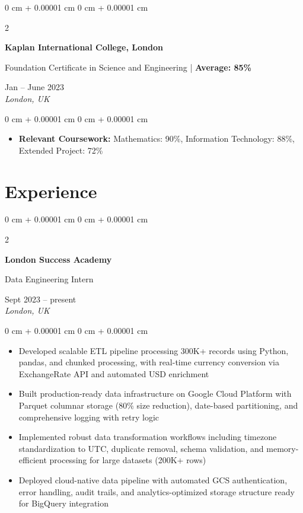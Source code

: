 \documentclass[10pt, a4paper]{article}
\newenvironment{highlights}{
    \begin{itemize}[
        topsep=0.10 cm,
        parsep=0.10 cm,
        partopsep=0pt,
        itemsep=0pt,
        leftmargin=20pt
    ]
}{
    \end{itemize}
} %
\newenvironment{onecolentry}{
    \begin{adjustwidth}{
        0 cm + 0.00001 cm
    }{
        0 cm + 0.00001 cm
    }
}{
    \end{adjustwidth}
} %
\newenvironment{twocolentry}[2][]{
    \onecolentry
    \def\secondColumn{#2}
    \setcolumnwidth{\fill, 4.5 cm}
    \begin{paracol}{2}
}{
    \switchcolumn \raggedleft \secondColumn
    \end{paracol}
    \endonecolentry
} %
\begin{document}
    \begin{twocolentry}{
        Jan -- June 2023 \\
        \textit{London, UK}
    }
        \textbf{Kaplan International College, London}

        Foundation Certificate in Science and Engineering | \textbf{Average: 85\%}
    \end{twocolentry}

    \vspace{0.10 cm}
    \begin{onecolentry}
        \begin{highlights}
            \item \textbf{Relevant Coursework:} Mathematics: 90\%, Information Technology: 88\%, Extended Project: 72\%
        \end{highlights}
    \end{onecolentry}


    \section{Experience}

    \begin{twocolentry}{
        Sept 2023 -- present \\
        \textit{London, UK}
    }
        \textbf{London Success Academy}
        
        Data Engineering Intern
    \end{twocolentry}

    \vspace{0.10 cm}
    \begin{onecolentry}
        \begin{highlights}
            \item Developed scalable ETL pipeline processing 300K+ records using Python, pandas, and chunked processing, with real-time currency conversion via ExchangeRate API and automated USD enrichment
            \item Built production-ready data infrastructure on Google Cloud Platform with Parquet columnar storage (80\% size reduction), date-based partitioning, and comprehensive logging with retry logic
            \item Implemented robust data transformation workflows including timezone standardization to UTC, duplicate removal, schema validation, and memory-efficient processing for large datasets (200K+ rows)
            \item Deployed cloud-native data pipeline with automated GCS authentication, error handling, audit trails, and analytics-optimized storage structure ready for BigQuery integration
        \end{highlights}
    \end{onecolentry}
\end{document}
